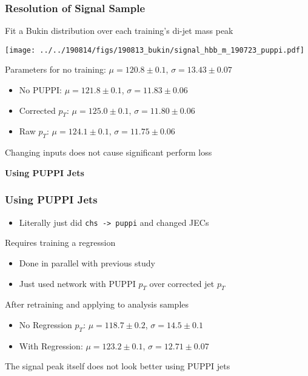 \documentclass{beamer}
\begin{document}
\begin{frame}
  \frametitle{Resolution of Signal Sample}

  Fit a Bukin distribution over each training's di-jet mass peak

  \begin{center}
    \texttt{[image: ../../190814/figs/190813\_bukin/signal\_hbb\_m\_190723\_puppi.pdf]}
  \end{center}

  Parameters for no training: $\mu = 120.8 \pm 0.1$, $\sigma = 13.43 \pm 0.07$

  \vspace{12pt}

  \begin{itemize}
  \item No PUPPI: $\mu = 121.8 \pm 0.1$, $\sigma = 11.83 \pm 0.06$
  \item Corrected $p_T$: $\mu = 125.0 \pm 0.1$, $\sigma = 11.80 \pm 0.06$
  \item Raw $p_T$: $\mu = 124.1 \pm 0.1$, $\sigma = 11.75 \pm 0.06$
  \end{itemize}

  Changing inputs does not cause significant perform loss

\end{frame}


\begin{frame}
  \centering
    {\Huge \bf\sffamily Using PUPPI Jets}
\end{frame}


\begin{frame}
  \frametitle{Using PUPPI Jets}

  \begin{itemize}
  \item Literally just did \texttt{chs -> puppi} and changed JECs
  \end{itemize}

  Requires training a regression

  \begin{itemize}
  \item Done in parallel with previous study
  \item Just used network with PUPPI $p_T$ over corrected jet $p_T$
  \end{itemize}

  After retraining and applying to analysis samples

  \begin{itemize}
  \item No Regression $p_T$: $\mu = 118.7 \pm 0.2$, $\sigma = 14.5 \pm 0.1$
  \item With Regression: $\mu = 123.2 \pm 0.1$, $\sigma = 12.71 \pm 0.07$
  \end{itemize}

  The signal peak itself does not look better using PUPPI jets

\end{frame}
\end{document}
